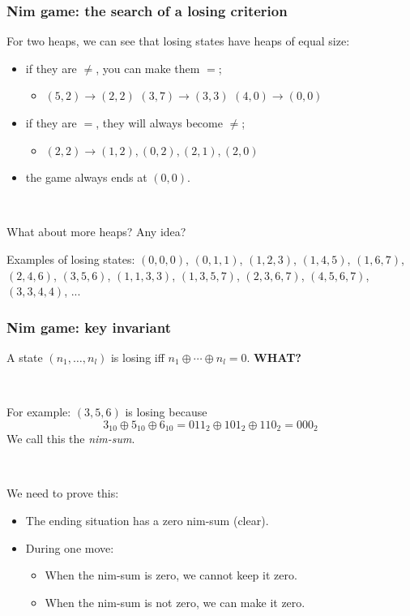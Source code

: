 \documentclass[12pt]{beamer}
\begin{document}
\begin{frame}
\frametitle{Nim game: the search of a losing criterion}
For two heaps, we can see that losing states have heaps of equal size:
\begin{itemize}
\item if they are $\neq$, you can make them $=$;
\begin{itemize} \item $(5,2) \rightarrow (2,2)$ \quad $(3,7) \rightarrow (3,3)$ \quad $(4,0) \rightarrow (0,0)$ \end{itemize}
\item if they are $=$, they will always become $\neq$;
\begin{itemize} \item $(2,2) \rightarrow (1,2), (0,2), (2,1), (2,0)$ \end{itemize}
\item the game always ends at $(0,0)$.
\end{itemize}

~

What about more heaps? Any idea?

Examples of losing states: $(0,0,0)$, $(0,1,1)$, $(1,2,3)$, $(1,4,5)$, $(1,6,7)$, $(2,4,6)$, $(3,5,6)$, $(1,1,3,3)$, $(1,3,5,7)$, $(2,3,6,7)$, $(4,5,6,7)$, $(3,3,4,4)$, ...
\end{frame}

\begin{frame}
\frametitle{Nim game: key invariant}
A state $(n_1,\ldots,n_l)$ is losing iff $n_1 \oplus \cdots \oplus n_l = 0$. \textbf{WHAT?}

~

For example: $(3,5,6)$ is losing because
\[3_{10} \oplus 5_{10} \oplus 6_{10} = 011_2 \oplus 101_2 \oplus 110_2 = 000_2 \]
We call this the \emph{nim-sum}.

~

We need to prove this:
\begin{itemize}
\item The ending situation has a zero nim-sum (clear).
\item During one move:
\begin{itemize}
\item When the nim-sum is zero, we cannot keep it zero.
\item When the nim-sum is not zero, we can make it zero.
\end{itemize}
\end{itemize}
\end{frame}
\end{document}
